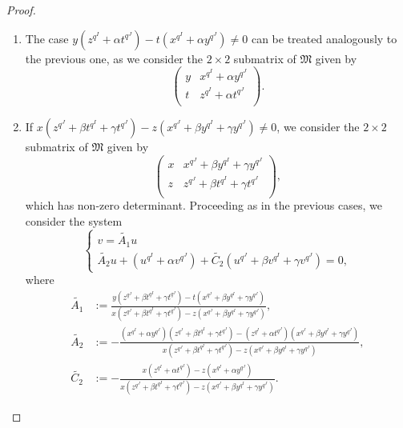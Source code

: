 \documentclass[11pt]{article}
\theoremstyle{definition}
\numberwithin{equation}{section}
\begin{document}
\begin{proof}
\begin{enumerate}
\item[(ii)] The case $y \left(z^{q^I}+\alpha t^{q^J}\right) - t\left(x^{q^I}+\alpha y^{q^J}\right)\neq 0$ can be treated analogously to the previous one, as we consider the $2\times 2$ submatrix of $\mathfrak{M}$ given by 
\begin{equation*}
    \begin{pmatrix}
    y &  x^{q^I}+\alpha y^{q^J} \\
    t &  z^{q^I}+\alpha t^{q^J}\\
    \end{pmatrix}.
\end{equation*}
\item[(iii)] If $x \left(z^{q^J}+\beta t^{q^I} + \gamma t^{q^J}\right) - z\left(x^{q^J}+\beta y^{q^I} + \gamma y^{q^J}\right)\neq 0$, we consider the $2\times 2$ submatrix of $\mathfrak{M}$ given by 
\begin{equation*}
    \begin{pmatrix}
    x &  x^{q^J}+\beta y^{q^I} + \gamma y^{q^J} \\
    z &  z^{q^J}+\beta t^{q^I} + \gamma t^{q^J} \\
    \end{pmatrix},
\end{equation*}
which has non-zero determinant. Proceeding as in the previous cases, we consider the system
\begin{equation*}
    \begin{cases}
     v = \tilde{A_1} u \\
    \tilde{A_2} u + \left(u^{q^I} + \alpha v^{q^J}\right) + \tilde{C_2}\left(u^{q^J} + \beta v^{q^I} + \gamma v^{q^J}\right) = 0,
    \end{cases}
\end{equation*}
where
\begin{equation*}
\begin{split}
    \tilde{A_1} &:= \frac{y \left(z^{q^J}+\beta t^{q^I} + \gamma t^{q^J}\right) - t\left(x^{q^J}+\beta y^{q^I} + \gamma y^{q^J}\right)}{x \left(z^{q^J}+\beta t^{q^I} + \gamma t^{q^J}\right) - z\left(x^{q^J}+\beta y^{q^I} + \gamma y^{q^J}\right)},\\
    \tilde{A_2} &:= -\frac{\left(x^{q^I}+\alpha y^{q^J}\right)\left(z^{q^J}+\beta t^{q^I} + \gamma t^{q^J}\right) - \left(z^{q^I}+\alpha t^{q^J}\right)\left(x^{q^J}+\beta y^{q^I} + \gamma y^{q^J}\right)}{x \left(z^{q^J}+\beta t^{q^I} + \gamma t^{q^J}\right) - z\left(x^{q^J}+\beta y^{q^I} + \gamma y^{q^J}\right)},\\
    \tilde{C_2} &:= -\frac{x \left(z^{q^I}+\alpha t^{q^J}\right) - z\left(x^{q^I}+\alpha y^{q^J}\right)}{x \left(z^{q^J}+\beta t^{q^I} + \gamma t^{q^J}\right) - z\left(x^{q^J}+\beta y^{q^I} + \gamma y^{q^J}\right)}.

\end{split}
\end{equation*}
\end{enumerate}
\end{proof}
\end{document}
